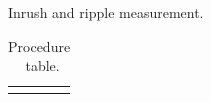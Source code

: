 \begin{stepstable}{\subprocid{} Inrush and ripple measurement.}

		\TurnOnMainSwitch
		\EnablePowerSupplyOutput
		\PowerOnPxi
	

		\CopyCegseLogsForEvicences{\subprocid}{}
		\CopyOscilloscopeScreenShotsForEvidences

		\RegisterTempAndHumidity
		\ClosePXISA
		\ConnectMeasurementProbesToAdHocBoxForXBand	
	


\end{stepstable}
\begin{longtable}{|p{17.0cm}|}
	\endfirsthead
	\endfoot
	\caption{Procedure \subprocid \ table.} \label{tb:proc:018-02}
\end{longtable}
